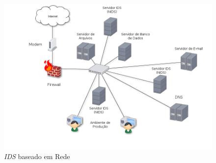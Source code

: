 \begin{figure}[!h]
\centering
\includegraphics[width = 15cm]{NIDS.png}
\caption{\textit{IDS} baseado em Rede} 	
\end{figure}

